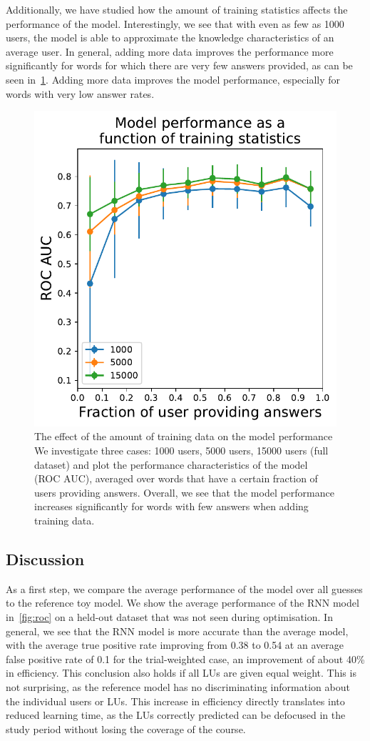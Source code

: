 Additionally, we have studied how the amount of training statistics affects the performance of the model. Interestingly, we see that with even as few as 1000 users, the model is able to approximate the knowledge characteristics of an average user. In general, adding more data improves the performance more significantly for words for which there are very few answers provided, as can be seen in~\cref{fig:statistics}. Adding more data improves the model performance, especially for words with very low answer rates.

\begin{figure}[ht]
\centering
\includegraphics[width=0.5\linewidth]{figures/lingvist/statistics.pdf}
\caption[The effect of training statistics on the model performance]{The effect of the amount of training data on the model performance We investigate three cases: 1000 users, 5000 users, 15000 users (full dataset) and plot the performance characteristics of the model (ROC AUC), averaged over words that have a certain fraction of users providing answers. Overall, we see that the model performance increases significantly for words with few answers when adding training data.}
\label{fig:statistics}
\end{figure}

\subsection{Discussion}

As a first step, we compare the average performance of the model over all guesses to the reference toy model. We show the average performance of the RNN model in~\cref{fig:roc} on a held-out dataset that was not seen during optimisation. In general, we see that the RNN model is more accurate than the average model, with the average true positive rate improving from 0.38 to 0.54 at an average false positive rate of 0.1 for the trial-weighted case, an improvement of about 40\% in efficiency. This conclusion also holds if all LUs are given equal weight. This is not surprising, as the reference model has no discriminating information about the individual users or LUs. This increase in efficiency directly translates into reduced learning time, as the LUs correctly predicted can be defocused in the study period without losing the coverage of the course.

